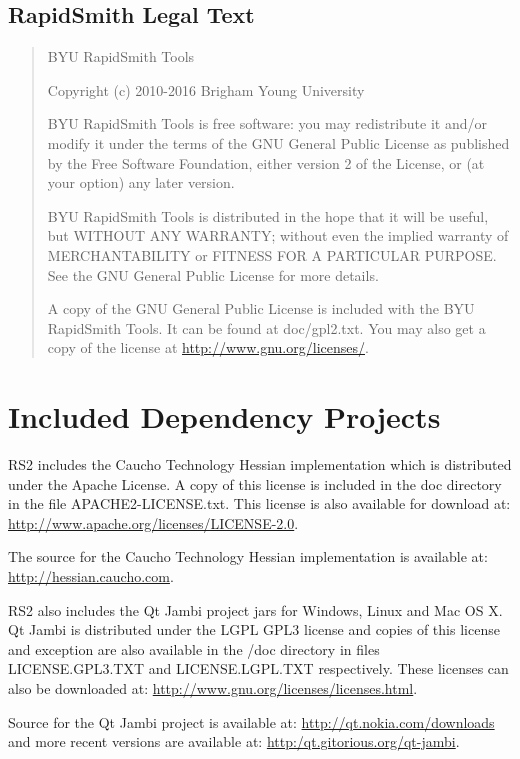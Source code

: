 \documentclass[12pt]{article}
\begin{document}
\subsection{RapidSmith Legal Text}
\begin{quotation}
   BYU RapidSmith Tools

   Copyright (c) 2010-2016 Brigham Young University
   
   BYU RapidSmith Tools is free software: you may redistribute it
   and/or modify it under the terms of the GNU General Public License
   as published by the Free Software Foundation, either version 2 of
   the License, or (at your option) any later version.
   
   BYU RapidSmith Tools is distributed in the hope that it will be
   useful, but WITHOUT ANY WARRANTY; without even the implied warranty
   of MERCHANTABILITY or FITNESS FOR A PARTICULAR PURPOSE. See the GNU
   General Public License for more details.
   
   A copy of the GNU General Public License is included with the BYU
   RapidSmith Tools. It can be found at doc/gpl2.txt. You may also get
   a copy of the license at \url{http://www.gnu.org/licenses/}.
\end{quotation}

\section{Included Dependency Projects}
RS2 includes the Caucho Technology Hessian implementation which is distributed
under the Apache License. A copy of this license is included in the doc
directory in the file APACHE2-LICENSE.txt. This license is also available for
download at: \url{http://www.apache.org/licenses/LICENSE-2.0}. 

The source for the Caucho Technology Hessian implementation is available at:
\url{http://hessian.caucho.com}.

RS2 also includes the Qt Jambi project jars for Windows, Linux and Mac OS X.  Qt
Jambi is distributed under the LGPL GPL3 license and copies of this license and
exception are also available in the /doc directory in files LICENSE.GPL3.TXT and
LICENSE.LGPL.TXT respectively. These licenses can also be downloaded at:
\url{http://www.gnu.org/licenses/licenses.html}.
   
Source for the Qt Jambi project is available at:
\url{http://qt.nokia.com/downloads} and more recent versions are available at:
\url{http:/qt.gitorious.org/qt-jambi}.
\end{document}
